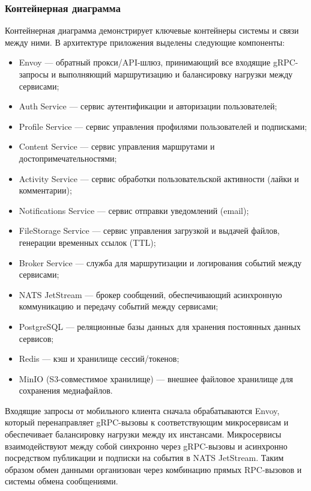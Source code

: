 \subsubsection*{Контейнерная диаграмма}
Контейнерная диаграмма демонстрирует ключевые контейнеры системы и связи между ними. В архитектуре приложения выделены следующие компоненты:
\begin{itemize}
    \item Envoy — обратный прокси/API-шлюз, принимающий все входящие gRPC-запросы и выполняющий маршрутизацию и балансировку нагрузки между сервисами;
    \item Auth Service — сервис аутентификации и авторизации пользователей;
    \item Profile Service — сервис управления профилями пользователей и подписками;
    \item Content Service — сервис управления маршрутами и достопримечательностями;
    \item Activity Service — сервис обработки пользовательской активности (лайки и комментарии);
    \item Notifications Service — сервис отправки уведомлений (email);
    \item FileStorage Service — сервис управления загрузкой и выдачей файлов, генерации временных ссылок (TTL);
    \item Broker Service — служба для маршрутизации и логирования событий между сервисами;
    \item NATS JetStream — брокер сообщений, обеспечивающий асинхронную коммуникацию и передачу событий между сервисами;
    \item PostgreSQL — реляционные базы данных для хранения постоянных данных сервисов;
    \item Redis — кэш и хранилище сессий/токенов;
    \item MinIO (S3-совместимое хранилище) — внешнее файловое хранилище для сохранения медиафайлов.
\end{itemize}
\noindent Входящие запросы от мобильного клиента сначала обрабатываются Envoy, который перенаправляет gRPC-вызовы к соответствующим микросервисам и обеспечивает балансировку нагрузки между их инстансами. Микросервисы взаимодействуют между собой синхронно через gRPC-вызовы и асинхронно посредством публикации и подписки на события в NATS JetStream. Таким образом обмен данными организован через комбинацию прямых RPC-вызовов и системы обмена сообщениями.
